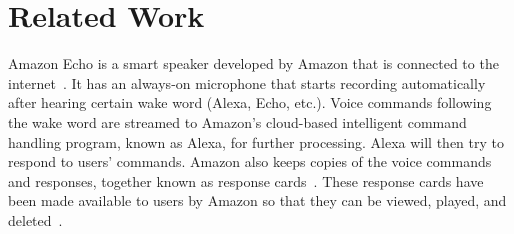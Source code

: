 \section{Related Work}
Amazon Echo is a smart speaker developed by Amazon that is connected to the internet~\cite{wikipedia_2019}. It has an always-on microphone that starts recording automatically after hearing certain wake word (Alexa, Echo, etc.). Voice commands following the wake word are streamed to Amazon's cloud-based intelligent command handling program, known as Alexa, for further processing. Alexa will then try to respond to users' commands. Amazon also keeps copies of the voice commands and responses, together known as response cards~\cite{ford2019alexa}. These response cards have been made available to users by Amazon so that they can be viewed, played, and deleted~\cite{amazon_2010}. 

